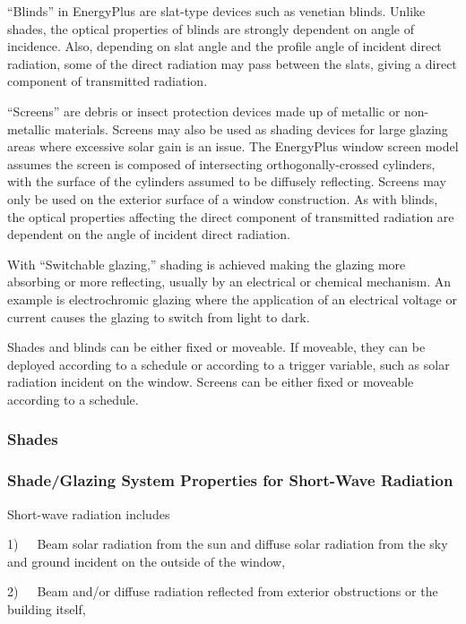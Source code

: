 ``Blinds'' in EnergyPlus are slat-type devices such as venetian blinds. Unlike shades, the optical properties of blinds are strongly dependent on angle of incidence. Also, depending on slat angle and the profile angle of incident direct radiation, some of the direct radiation may pass between the slats, giving a direct component of transmitted radiation.

``Screens'' are debris or insect protection devices made up of metallic or non-metallic materials. Screens may also be used as shading devices for large glazing areas where excessive solar gain is an issue. The EnergyPlus window screen model assumes the screen is composed of intersecting orthogonally-crossed cylinders, with the surface of the cylinders assumed to be diffusely reflecting. Screens may only be used on the exterior surface of a window construction. As with blinds, the optical properties affecting the direct component of transmitted radiation are dependent on the angle of incident direct radiation.

With ``Switchable glazing,'' shading is achieved making the glazing more absorbing or more reflecting, usually by an electrical or chemical mechanism. An example is electrochromic glazing where the application of an electrical voltage or current causes the glazing to switch from light to dark.

Shades and blinds can be either fixed or moveable. If moveable, they can be deployed according to a schedule or according to a trigger variable, such as solar radiation incident on the window. Screens can be either fixed or moveable according to a schedule.

\subsubsection{Shades}\label{shades}

\subsubsection{Shade/Glazing System Properties for Short-Wave Radiation}\label{shadeglazing-system-properties-for-short-wave-radiation}

Short-wave radiation includes

1)~~~Beam solar radiation from the sun and diffuse solar radiation from the sky and ground incident on the outside of the window,

2)~~~Beam and/or diffuse radiation reflected from exterior obstructions or the building itself,

